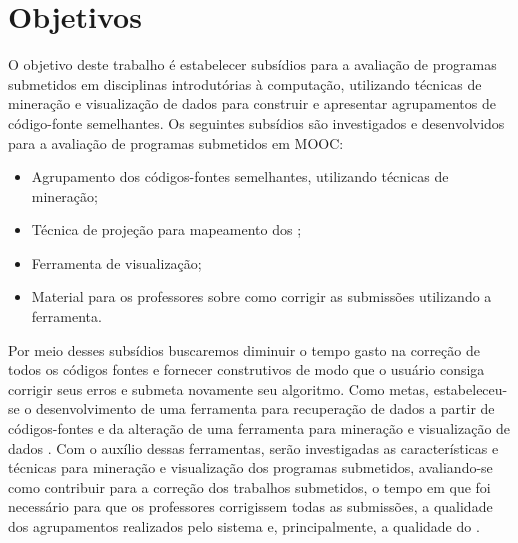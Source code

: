 \chapter{Objetivos}

O objetivo deste trabalho é estabelecer subsídios para a avaliação de
programas submetidos em disciplinas introdutórias à computação, utilizando técnicas
de mineração e visualização de dados para construir e apresentar agrupamentos de
código-fonte semelhantes. Os seguintes subsídios são investigados e desenvolvidos
para a avaliação de programas submetidos em \acs{MOOC}:

\begin{itemize}
	\item Agrupamento dos códigos-fontes semelhantes, utilizando técnicas de mineração;
	\item Técnica de projeção para mapeamento dos ;
	\item Ferramenta de visualização;
	\item Material para os professores sobre como corrigir as submissões utilizando a ferramenta.
\end{itemize}

Por meio desses subsídios buscaremos diminuir o tempo gasto na correção de todos os códigos
fontes e  fornecer  construtivos de modo que o usuário consiga
corrigir seus erros e submeta novamente seu algoritmo. Como metas, estabeleceu-se
o desenvolvimento de uma ferramenta para recuperação de dados a partir de
códigos-fontes e da alteração de uma ferramenta para mineração e visualização de
dados \cite{Alencar-etal:2012}. Com o auxílio dessas ferramentas, serão investigadas as
características e técnicas para mineração e visualização dos programas submetidos,
avaliando-se como contribuir para a correção dos trabalhos submetidos, o tempo em
que foi necessário para que os professores corrigissem todas as submissões, a
qualidade dos agrupamentos realizados pelo sistema e, principalmente, a
qualidade do .